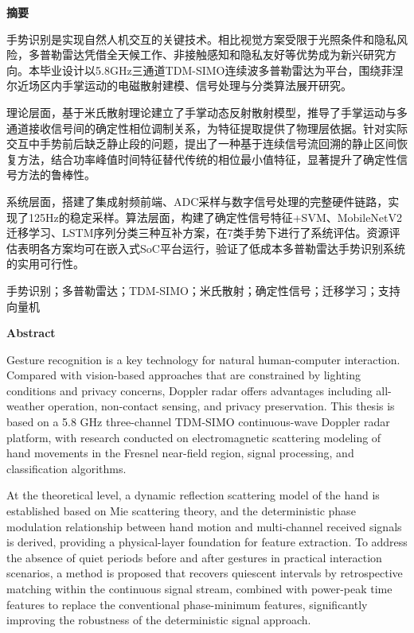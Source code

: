 \setcounter{page}{7}
\begin{center}
    \vspace{0.5ex}
    \bfseries 摘要
    \vspace{0.5ex}
\end{center}


手势识别是实现自然人机交互的关键技术。相比视觉方案受限于光照条件和隐私风险，多普勒雷达凭借全天候工作、非接触感知和隐私友好等优势成为新兴研究方向。本毕业设计以5.8GHz三通道TDM-SIMO连续波多普勒雷达为平台，围绕菲涅尔近场区内手掌运动的电磁散射建模、信号处理与分类算法展开研究。

理论层面，基于米氏散射理论建立了手掌动态反射散射模型，推导了手掌运动与多通道接收信号间的确定性相位调制关系，为特征提取提供了物理层依据。针对实际交互中手势前后缺乏静止段的问题，提出了一种基于连续信号流回溯的静止区间恢复方法，结合功率峰值时间特征替代传统的相位最小值特征，显著提升了确定性信号方法的鲁棒性。

系统层面，搭建了集成射频前端、ADC采样与数字信号处理的完整硬件链路，实现了125Hz的稳定采样。算法层面，构建了确定性信号特征+SVM、MobileNetV2迁移学习、LSTM序列分类三种互补方案，在7类手势下进行了系统评估。资源评估表明各方案均可在嵌入式SoC平台运行，验证了低成本多普勒雷达手势识别系统的实用可行性。

手势识别；多普勒雷达；TDM-SIMO；米氏散射；确定性信号；迁移学习；支持向量机

\newpage
\setcounter{page}{9}

\begin{center}
    \vspace{0.5ex}
    \bfseries Abstract
    \vspace{0.5ex}
\end{center}

Gesture recognition is a key technology for natural human-computer interaction. Compared with vision-based approaches that are constrained by lighting conditions and privacy concerns, Doppler radar offers advantages including all-weather operation, non-contact sensing, and privacy preservation. This thesis is based on a 5.8 GHz three-channel TDM-SIMO continuous-wave Doppler radar platform, with research conducted on electromagnetic scattering modeling of hand movements in the Fresnel near-field region, signal processing, and classification algorithms.

At the theoretical level, a dynamic reflection scattering model of the hand is established based on Mie scattering theory, and the deterministic phase modulation relationship between hand motion and multi-channel received signals is derived, providing a physical-layer foundation for feature extraction. To address the absence of quiet periods before and after gestures in practical interaction scenarios, a method is proposed that recovers quiescent intervals by retrospective matching within the continuous signal stream, combined with power-peak time features to replace the conventional phase-minimum features, significantly improving the robustness of the deterministic signal approach.

